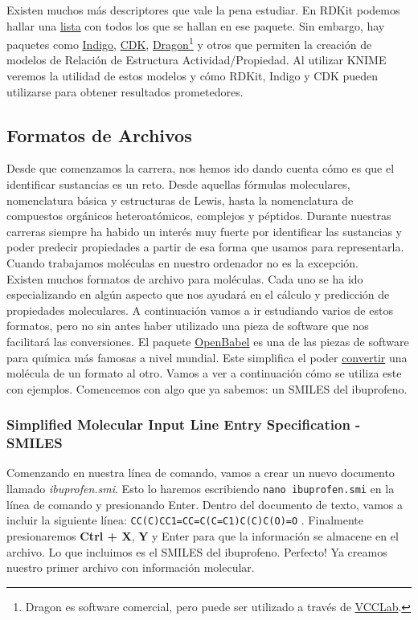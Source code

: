 \documentclass[10pt,letterpaper]{article}
\newcommand{\inlinecode}[1]{
\colorbox{light-gray}{\texttt{#1}}
}
\begin{document}
Existen muchos m\'as descriptores que vale la pena estudiar. En RDKit podemos hallar una \href{http://www.rdkit.org/docs/GettingStartedInPython.html#list-of-available-descriptors}{lista} con todos los que se hallan en ese paquete. Sin embargo, hay paquetes como \href{http://lifescience.opensource.epam.com/indigo/}{Indigo}, \href{https://cdk.github.io/}{CDK}, \href{https://chm.kode-solutions.net/products_dragon.php}{Dragon}\footnote{Dragon es software comercial, pero puede ser utilizado a trav\'es de \href{http://www.vcclab.org/lab/edragon/}{VCCLab}.} y otros que permiten la creaci\'on de modelos de Relaci\'on de Estructura Actividad/Propiedad. Al utilizar KNIME veremos la utilidad de estos modelos y c\'omo RDKit, Indigo y CDK pueden utilizarse para obtener resultados prometedores.

\subsection{Formatos de Archivos}
Desde que comenzamos la carrera, nos hemos ido dando cuenta c\'omo es que el identificar sustancias es un reto. Desde aquellas f\'ormulas moleculares, nomenclatura b\'asica y estructuras de Lewis, hasta la nomenclatura de compuestos org\'anicos heteroat\'omicos, complejos y p\'eptidos. Durante nuestras carreras siempre ha habido un inter\'es muy fuerte por identificar las sustancias y poder predecir propiedades a partir de esa forma que usamos para representarla. Cuando trabajamos mol\'eculas en nuestro ordenador no es la excepci\'on.\\

Existen muchos formatos de archivo para mol\'eculas. Cada uno se ha ido especializando en alg\'un aspecto que nos ayudar\'a en el c\'alculo y predicci\'on de propiedades moleculares. A continuaci\'on vamos a ir estudiando varios de estos formatos, pero no sin antes haber utilizado una pieza de software que nos facilitar\'a las conversiones. El paquete \href{http://openbabel.org/wiki/Main_Page}{OpenBabel} es una de las piezas de software para qu\'imica m\'as famosas a nivel mundial. Este simplifica el poder \href{https://openbabel.org/docs/dev/Command-line_tools/babel.html}{convertir} una mol\'ecula de un formato al otro. Vamos a ver a continuaci\'on c\'omo se utiliza este con ejemplos. Comencemos con algo que ya sabemos: un SMILES del ibuprofeno.

\subsubsection{Simplified Molecular Input Line Entry Specification - SMILES}
Comenzando en nuestra l\'inea de comando, vamos a crear un nuevo documento llamado \textit{ibuprofen.smi}. Esto lo haremos escribiendo \inlinecode{nano ibuprofen.smi} en la l\'inea de comando y presionando Enter. Dentro del documento de texto, vamos a incluir la siguiente l\'inea: \inlinecode{CC(C)CC1=CC=C(C=C1)C(C)C(O)=O}. Finalmente presionaremos \textbf{Ctrl + X}, \textbf{Y} y Enter para que la informaci\'on se almacene en el archivo. Lo que incluimos es el SMILES del ibuprofeno. Perfecto! Ya creamos nuestro primer archivo con informaci\'on molecular.\\
\end{document}
